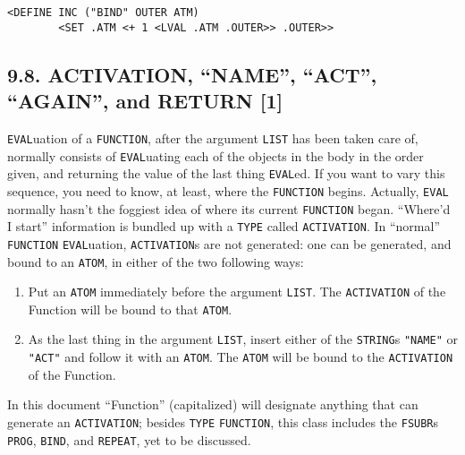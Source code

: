 \documentclass[a4paper,]{article}
\providecommand{\tightlist}{%
  \setlength{\itemsep}{0pt}\setlength{\parskip}{0pt}}
\begin{document}
\begin{verbatim}
<DEFINE INC ("BIND" OUTER ATM)
        <SET .ATM <+ 1 <LVAL .ATM .OUTER>> .OUTER>>
\end{verbatim}

\subsection{\texorpdfstring{9.8. ACTIVATION, ``NAME'', ``ACT'', ``AGAIN'', and RETURN
{[}1{]}}{9.8. ACTIVATION, NAME, ACT, AGAIN, and RETURN {[}1{]}}}\label{activation-name-act-again-and-return-1}

   \texttt{EVAL}uation of a
\texttt{FUNCTION}, after the argument \texttt{LIST} has been taken care of, normally consists of
\texttt{EVAL}uating each of the objects in the body in the order given, and returning the value of the last thing
\texttt{EVAL}ed. If you want to vary this sequence, you need to know, at least, where the \texttt{FUNCTION} begins.
Actually, \texttt{EVAL} normally hasn't the foggiest idea of where its current \texttt{FUNCTION} began. ``Where'd I start''
information is bundled up with a \texttt{TYPE} called \texttt{ACTIVATION}. In ``normal'' \texttt{FUNCTION}
\texttt{EVAL}uation, \texttt{ACTIVATION}s are not generated: one can be generated, and bound to an \texttt{ATOM}, in either
of the two following ways:

\begin{enumerate}
\def\labelenumi{\arabic{enumi}.}
\tightlist
\item
  Put an \texttt{ATOM} immediately before the argument \texttt{LIST}. The \texttt{ACTIVATION} of the Function will be bound
  to that \texttt{ATOM}.
\item
  As the last thing in the argument \texttt{LIST}, insert either of the \texttt{STRING}s \texttt{"NAME"}
   or \texttt{"ACT"} and follow it with an \texttt{ATOM}. The \texttt{ATOM} will be bound
  to the \texttt{ACTIVATION} of the Function.
\end{enumerate}

In this document ``Function'' (capitalized) will designate anything that can generate an
\texttt{ACTIVATION}; besides \texttt{TYPE} \texttt{FUNCTION}, this class includes the \texttt{FSUBR}s
\texttt{PROG}, \texttt{BIND}, and \texttt{REPEAT}, yet to
be discussed.
\end{document}
